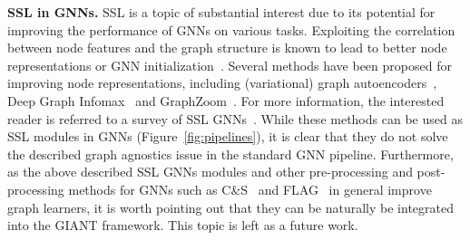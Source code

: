 \documentclass{article} \usepackage{iclr2022_conference,times}
\begin{document}
\textbf{SSL in GNNs.} 
SSL is a topic of substantial interest due to its potential for improving the performance of GNNs on various tasks. Exploiting the correlation between node features and the graph structure is known to lead to better node representations or GNN initialization~\citep{Hu*2020Strategies,you2018graphrnn,you2020graph,hu2020gpt}. Several methods have been proposed for improving node representations, including (variational) graph autoencoders~\citep{kipf2016variational}, Deep Graph Infomax~\citep{velickovic2019deep} and GraphZoom~\citep{deng2020graphzoom}. For more information, the interested reader is referred to a survey of SSL GNNs~\citep{xie2021self}. While these methods can be used as SSL modules in GNNs (Figure~\ref{fig:pipelines}), it is clear that they do not solve the described graph agnostics issue in the standard GNN pipeline. Furthermore, as the above described SSL GNNs modules and other pre-processing and post-processing methods for GNNs such as C\&S~\citep{huang2021combining} and FLAG~\citep{kong2020flag} in general improve graph learners, it is worth pointing out that they can be naturally be integrated into the GIANT framework. This topic is left as a future work.  
\end{document}
